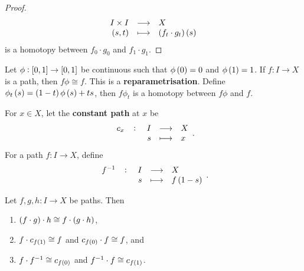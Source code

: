 \begin{proof}
$$ \function{I \times I}{X}{\br{s, t}}{\br{f_t \cdot g_t}\br{s}} $$
is a homotopy between $ f_0 \cdot g_0 $ and $ f_1 \cdot g_1 $.
\end{proof}

\begin{remark*}
Let $ \phi : \sbr{0, 1} \to \sbr{0, 1} $ be continuous such that $ \phi\br{0} = 0 $ and $ \phi\br{1} = 1 $. If $ f : I \to X $ is a path, then $ f\phi \cong f $. This is a \textbf{reparametrisation}. Define $ \phi_t\br{s} = \br{1 - t}\phi\br{s} + ts $, then $ f\phi_t $ is a homotopy between $ f\phi $ and $ f $.
\end{remark*}

For $ x \in X $, let the \textbf{constant path} at $ x $ be
$$ \function[c_x]{I}{X}{s}{x}. $$
For a path $ f : I \to X $, define
$$ \function[f^{-1}]{I}{X}{s}{f\br{1 - s}}. $$

\begin{lemma}
\label{lem:1.3}
Let $ f, g, h : I \to X $ be paths. Then
\begin{enumerate}
\item $ \br{f \cdot g} \cdot h \cong f \cdot \br{g \cdot h} $,
\item $ f \cdot c_{f\br{1}} \cong f $ and $ c_{f\br{0}} \cdot f \cong f $, and
\item $ f \cdot f^{-1} \cong c_{f\br{0}} $ and $ f^{-1} \cdot f \cong c_{f\br{1}} $.
\end{enumerate}
\end{lemma}

